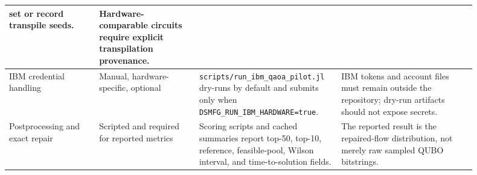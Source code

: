 \begin{table}[t]
\begin{tabular}{p{0.18\linewidth}p{0.20\linewidth}p{0.25\linewidth}p{0.27\linewidth}}
set or record transpile seeds. & Hardware-comparable circuits require explicit
transpilation provenance. \\
\hline
IBM credential handling & Manual, hardware-specific, optional &
\texttt{scripts/run\_ibm\_qaoa\_pilot.jl} dry-runs by default and submits only
when \texttt{DSMFG\_RUN\_IBM\_HARDWARE=true}. & IBM tokens and account files
must remain outside the repository; dry-run artifacts should not expose
secrets. \\
\hline
Postprocessing and exact repair & Scripted and required for reported metrics &
Scoring scripts and cached summaries report top-50, top-10, reference,
feasible-pool, Wilson interval, and time-to-solution fields. & The reported
result is the repaired-flow distribution, not merely raw sampled QUBO
bitstrings. \\
\hline
\end{tabular}
\end{table}

